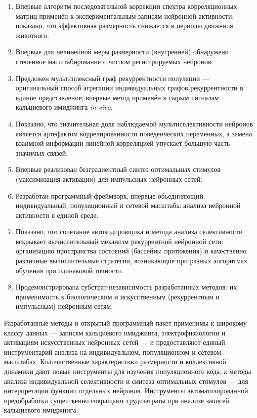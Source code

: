 {\novelty}
\begin{enumerate}[beginpenalty=10000]
  \item Впервые алгоритм последовательной коррекции спектра корреляционных
  матриц применён к экспериментальным записям нейронной активности; показано,
  что эффективная размерность снижается в периоды движения животного.
  \item Впервые для нелинейной меры размерности (внутренней) обнаружено
  степенное масштабирование с числом регистрируемых нейронов.
  \item Предложен мультиплексный граф рекуррентности популяции --- оригинальный
  способ агрегации индивидуальных графов рекуррентности в единое представление;
  впервые метод применён к сырым сигналам кальциевого имиджинга \textit{in vivo}.
  \item Показано, что значительная доля наблюдаемой мультиселективности
  нейронов является артефактом коррелированности поведенческих переменных,
  а замена взаимной информации линейной корреляцией упускает большую часть
  значимых связей.
  \item Впервые реализован безградиентный синтез оптимальных стимулов
  (максимизация активации) для импульсных нейронных сетей.
  \item Разработан программный фреймворк, впервые объединяющий индивидуальный,
  популяционный и сетевой масштабы анализа нейронной активности в единой среде.
  \item Показано, что сочетание автокодировщика и метода анализа селективности
  вскрывает вычислительный механизм рекуррентной нейронной сети: организацию
  пространства состояний (бассейны притяжения) и качественно различные
  вычислительные стратегии, возникающие при разных алгоритмах обучения при
  одинаковой точности.
  \item Продемонстрирована субстрат-независимость разработанных методов:
  их применимость к биологическим и искусственным (рекуррентным и импульсным)
  нейронным сетям.
\end{enumerate}


{\influence} Разработанные методы и открытый программный пакет применимы
к широкому классу данных --- записям кальциевого имиджинга, электрофизиологии
и активациям искусственных нейронных сетей --- и предоставляют единый
инструментарий анализа на индивидуальном, популяционном и сетевом масштабах.
Количественные характеристики размерности и коллективной динамики дают новые
инструменты для изучения популяционного кода, а методы анализа индивидуальной
селективности и синтеза оптимальных стимулов --- для интерпретации функции
отдельных нейронов. Инструменты автоматизированной предобработки существенно
сокращают трудозатраты при анализе записей кальциевого имиджинга.


